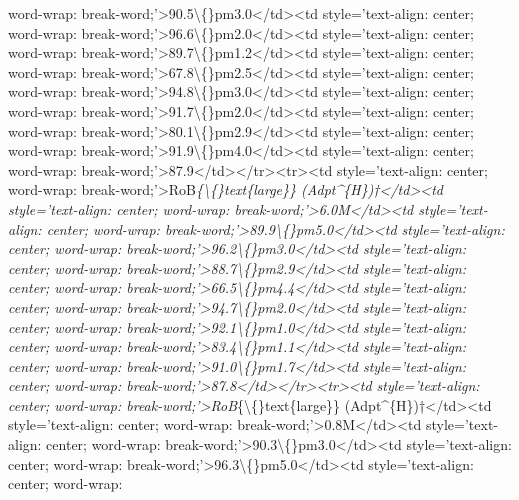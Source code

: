 \documentclass[conference]{IEEEtran}
\begin{document}
word-wrap: break-word;'\textgreater{}90.5\textbackslash\{\}pm3.0\textless{}/td\textgreater{}\textless{}td style='text-align: center; word-wrap: break-word;'\textgreater{}96.6\textbackslash\{\}pm2.0\textless{}/td\textgreater{}\textless{}td style='text-align: center; word-wrap: break-word;'\textgreater{}89.7\textbackslash\{\}pm1.2\textless{}/td\textgreater{}\textless{}td style='text-align: center; word-wrap: break-word;'\textgreater{}67.8\textbackslash\{\}pm2.5\textless{}/td\textgreater{}\textless{}td style='text-align: center; word-wrap: break-word;'\textgreater{}94.8\textbackslash\{\}pm3.0\textless{}/td\textgreater{}\textless{}td style='text-align: center; word-wrap: break-word;'\textgreater{}91.7\textbackslash\{\}pm2.0\textless{}/td\textgreater{}\textless{}td style='text-align: center; word-wrap: break-word;'\textgreater{}80.1\textbackslash\{\}pm2.9\textless{}/td\textgreater{}\textless{}td style='text-align: center; word-wrap: break-word;'\textgreater{}91.9\textbackslash\{\}pm4.0\textless{}/td\textgreater{}\textless{}td style='text-align: center; word-wrap: break-word;'\textgreater{}87.9\textless{}/td\textgreater{}\textless{}/tr\textgreater{}\textless{}tr\textgreater{}\textless{}td style='text-align: center; word-wrap: break-word;'\textgreater{}RoB\textit{\{\textbackslash\{\}text\{large\}\} (Adpt\textasciicircum{}\{H\})†\textless{}/td\textgreater{}\textless{}td style='text-align: center; word-wrap: break-word;'\textgreater{}6.0M\textless{}/td\textgreater{}\textless{}td style='text-align: center; word-wrap: break-word;'\textgreater{}89.9\textbackslash\{\}pm5.0\textless{}/td\textgreater{}\textless{}td style='text-align: center; word-wrap: break-word;'\textgreater{}96.2\textbackslash\{\}pm3.0\textless{}/td\textgreater{}\textless{}td style='text-align: center; word-wrap: break-word;'\textgreater{}88.7\textbackslash\{\}pm2.9\textless{}/td\textgreater{}\textless{}td style='text-align: center; word-wrap: break-word;'\textgreater{}66.5\textbackslash\{\}pm4.4\textless{}/td\textgreater{}\textless{}td style='text-align: center; word-wrap: break-word;'\textgreater{}94.7\textbackslash\{\}pm2.0\textless{}/td\textgreater{}\textless{}td style='text-align: center; word-wrap: break-word;'\textgreater{}92.1\textbackslash\{\}pm1.0\textless{}/td\textgreater{}\textless{}td style='text-align: center; word-wrap: break-word;'\textgreater{}83.4\textbackslash\{\}pm1.1\textless{}/td\textgreater{}\textless{}td style='text-align: center; word-wrap: break-word;'\textgreater{}91.0\textbackslash\{\}pm1.7\textless{}/td\textgreater{}\textless{}td style='text-align: center; word-wrap: break-word;'\textgreater{}87.8\textless{}/td\textgreater{}\textless{}/tr\textgreater{}\textless{}tr\textgreater{}\textless{}td style='text-align: center; word-wrap: break-word;'\textgreater{}RoB}\{\textbackslash\{\}text\{large\}\} (Adpt\textasciicircum{}\{H\})†\textless{}/td\textgreater{}\textless{}td style='text-align: center; word-wrap: break-word;'\textgreater{}0.8M\textless{}/td\textgreater{}\textless{}td style='text-align: center; word-wrap: break-word;'\textgreater{}90.3\textbackslash\{\}pm3.0\textless{}/td\textgreater{}\textless{}td style='text-align: center; word-wrap: break-word;'\textgreater{}96.3\textbackslash\{\}pm5.0\textless{}/td\textgreater{}\textless{}td style='text-align: center; word-wrap: 
\end{document}
